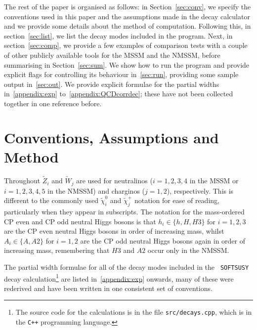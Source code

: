 \documentclass[final,3p,times]{elsarticle}
\def\code#1{{\tt #1}}
\begin{document}
The rest of the paper is organised as follows: in Section~\ref{sec:conv}, we 
specify the conventions used in this paper and the assumptions made in the
decay calculator and we provide some details about the method of computation. Following this, in section~\ref{sec:list}, we list the decay modes included in the program. Next, in section~\ref{sec:comp}, 
we provide a few examples of comparison tests 
with a couple of other publicly available tools for the MSSM and the NMSSM,
before summarising in Section~\ref{sec:sum}. We show how to run the program and
provide explicit flags for controlling its behaviour in~\ref{sec:run}, providing some sample output in~\ref{sec:out}. 
We provide explicit formulae for
the partial widths in~\ref{appendix:exp} to~\ref{appendix:QCDcorrdec}; these have not been collected
together in one reference before. 

\section{Conventions, Assumptions and Method \label{sec:conv}}

Throughout $\tilde{Z}_i$ and $\tilde{W}_j$ are used for neutralinos
($i=1,2,3,4$ in the MSSM or $i=1,2,3,4,5$ in the NMSSM) and charginos
($j=1,2$), respectively. This  is different to the commonly used
$\tilde{\chi}_{i}^{0}$ and $\tilde{\chi}_{j}^+$ notation for ease of reading, particularly
when they appear in subscripts. The notation for the mass-ordered CP even and
CP odd neutral Higgs bosons is that $h_i \in \{h, H, H3\}$ for $i=1,2,3$ are the CP even neutral Higgs
bosons in order of increasing mass, whilst $A_i \in \{A, A2\}$ for $i=1,2$ are the CP odd neutral
Higgs bosons again in order of increasing mass, remembering that $H3$ and $A2$
occur only in the NMSSM. 

The partial width formulae for all of the decay modes included in the {\tt
  SOFTSUSY} decay calculation\footnote{The source code for the calculations
  is in the file
  \code{src/decays.cpp}, which is in the \code{C++} programming language.} are
listed in~\ref{appendix:exp} 
onwards, many of these were rederived and have been written in one consistent
set of conventions. 
\end{document}
